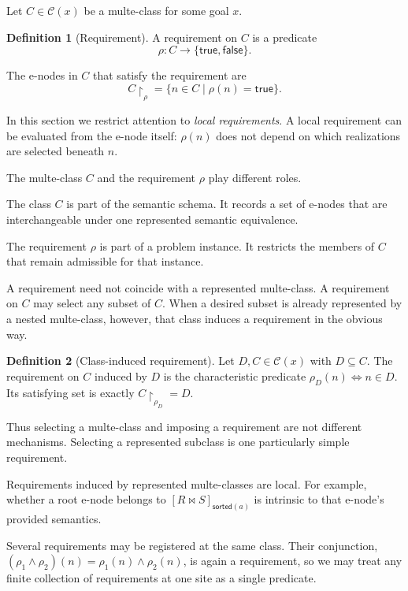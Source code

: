 \documentclass[sigconf,nonacm]{acmart}
\theoremstyle{definition}
\newtheorem{definition}{Definition}[section]
\theoremstyle{plain}
\theoremstyle{remark}
\begin{document}
Let \(C\in\mathcal C(x)\) be a multe-class for some goal \(x\).

\begin{definition}[Requirement]
A requirement on \(C\) is a predicate
\[
\rho:C\longrightarrow\{\mathsf{true},\mathsf{false}\}.
\]

The e-nodes in \(C\) that satisfy the requirement are
\[
C\!\restriction_{\rho}
=
\{n\in C\mid \rho(n)=\mathsf{true}\}.
\]
\end{definition}

In this section we restrict attention to \emph{local requirements}.
A local requirement can be evaluated from the e-node itself:
\(\rho(n)\) does not depend on which realizations are selected
beneath \(n\).

The multe-class \(C\) and the requirement \(\rho\) play different
roles.

The class \(C\) is part of the semantic schema.
It records a set of e-nodes that are interchangeable under one
represented semantic equivalence.

The requirement \(\rho\) is part of a problem instance.
It restricts the members of \(C\) that remain admissible for that
instance.

A requirement need not coincide with a represented multe-class.
A requirement on \(C\) may select any subset of \(C\).
When a desired subset is already represented by a nested
multe-class, however, that class induces a requirement in the obvious
way.

\begin{definition}[Class-induced requirement]
Let \(D,C\in\mathcal C(x)\) with \(D\subseteq C\).
The requirement on \(C\) induced by \(D\) is the characteristic
predicate
\(\rho_D(n) \Leftrightarrow n\in D\).
Its satisfying set is exactly \(C\!\restriction_{\rho_D}=D\).
\end{definition}

Thus selecting a multe-class and imposing a requirement are not
different mechanisms.
Selecting a represented subclass is one particularly simple
requirement.

Requirements induced by represented multe-classes are local.  For
example, whether a root e-node belongs to
\([R\Join S]_{\mathsf{sorted}(a)}\) is intrinsic to that e-node's
provided semantics.

Several requirements may be registered at the same class.
Their conjunction, \((\rho_1\wedge\rho_2)(n) =
\rho_1(n)\wedge\rho_2(n)\), is again a requirement, so we may treat
any finite collection of requirements at one site as a single
predicate.
\end{document}
